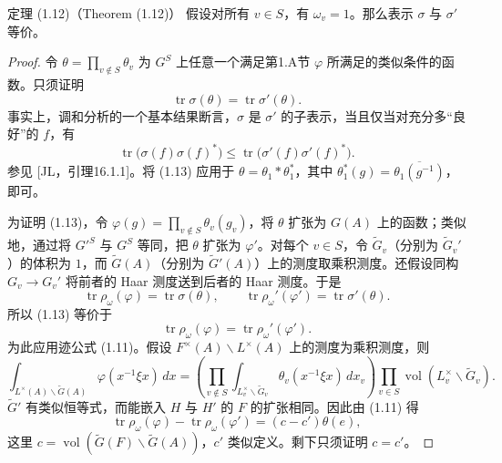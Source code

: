 \begin{originaltheorem}{定理 (1.12)（Theorem (1.12)）}
假设对所有 $v\in S$，有 $\omega_v=1$。那么表示 $\sigma$ 与 $\sigma'$ 等价。
\end{originaltheorem}
\begin{proof}
令 $\theta=\prod_{v\notin S}\theta_v$ 为 $G^S$ 上任意一个满足第1.A节 $\varphi$ 所满足的类似条件的函数。只须证明
\begin{equation}
 \operatorname{tr}\sigma(\theta)=\operatorname{tr}\sigma'(\theta).\tag{1.13}
\end{equation}
事实上，调和分析的一个基本结果断言，$\sigma$ 是 $\sigma'$ 的子表示，当且仅当对充分多“良好”的 $f$，有
\begin{equation}
 \operatorname{tr}\bigl(\sigma(f)\sigma(f)^*\bigr)
 \le\operatorname{tr}\bigl(\sigma'(f)\sigma'(f)^*\bigr).\tag{1.14}
\end{equation}
参见 [JL，引理16.1.1]。将 (1.13) 应用于
$\theta=\theta_1*\theta_1^*$，其中 $\theta_1^*(g)=\overline{\theta_1(g^{-1})}$，即可。

为证明 (1.13)，令 $\varphi(g)=\prod_{v\notin S}\theta_v(g_v)$，将 $\theta$ 扩张为 $G(A)$ 上的函数；类似地，通过将 $G'^S$ 与 $G^S$ 等同，把 $\theta$ 扩张为 $\varphi'$。对每个
$v\in S$，令 $\widetilde G_v$（分别为 $\widetilde G_v'$）的体积为 $1$，而
$\widetilde G(A)$（分别为 $\widetilde G'(A)$）上的测度取乘积测度。还假设同构 $G_v\to G_v'$ 将前者的 Haar 测度送到后者的 Haar 测度。于是
\begin{equation}
 \operatorname{tr}\rho_\omega(\varphi)=\operatorname{tr}\sigma(\theta),
 \qquad\operatorname{tr}\rho_\omega'(\varphi')=\operatorname{tr}\sigma'(\theta).\tag{1.15}
\end{equation}
所以 (1.13) 等价于
\begin{equation}
 \operatorname{tr}\rho_\omega(\varphi)=\operatorname{tr}\rho_\omega'(\varphi').\tag{1.16}
\end{equation}
为此应用迹公式 (1.11)。假设 $F^\times(A)\backslash L^\times(A)$ 上的测度为乘积测度，则
\[
 \int_{L^\times(A)\backslash\widetilde G(A)}\varphi(x^{-1}\xi x)\,dx
 =\left(\prod_{v\notin S}\int_{L_v^\times\backslash\widetilde G_v}
 \theta_v(x^{-1}\xi x)\,dx_v\right)
 \prod_{v\in S}\operatorname{vol}(L_v^\times\backslash\widetilde G_v).
\]
$\widetilde G'$ 有类似恒等式，而能嵌入 $H$ 与 $H'$ 的 $F$ 的扩张相同。因此由 (1.11) 得
\begin{equation}
 \operatorname{tr}\rho_\omega(\varphi)-\operatorname{tr}\rho_\omega(\varphi')
 =(c-c')\theta(e),\tag{1.17}
\end{equation}
这里 $c=\operatorname{vol}(\widetilde G(F)\backslash\widetilde G(A))$，$c'$ 类似定义。剩下只须证明
$c=c'$。


\end{proof}
